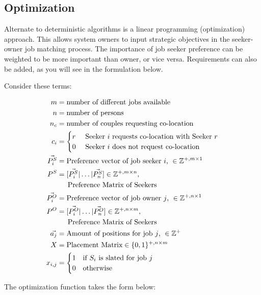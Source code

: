 \subsection{Optimization}

Alternate to deterministic algorithms is a linear programming (optimization) approach. This allows system owners to input strategic objectives in the seeker-owner job matching process. The importance of job seeker preference can be weighted to be more important than owner, or vice versa. Requirements can also be added, as you will see in the formulation below.

Consider these terms:

\begin{align}
m &= \text{number of different jobs available}\\
n &= \text{number of persons}\\
n_c &= \text{number of couples requesting co-location}\\
c_i &= \begin{cases}
r & \text{ Seeker $i$ requests co-location with Seeker $r$} \\
0 & \text{ Seeker $i$ does not request co-location}
\end{cases} \\
\vec{P^S_i} &= \text{Preference vector of job seeker $i$, } \in \mathbb{Z}^{+, m \times 1} \\
P^S &= [\vec{P^S_i} | \dots | \vec{P^S_n}] \in \mathbb{Z}^{+, m \times n}, \\ 
&\text{\indent Preference Matrix of Seekers} \\
\vec{P^O_i} &= \text{Preference vector of job owner $j$, } \in \mathbb{Z}^{+, n \times 1} \\
P^O &= [\vec{P^O_i} | \dots | \vec{P^O_n}] \in \mathbb{Z}^{+, n \times m}, \\ 
&\text{\indent Preference Matrix of Seekers} \\
\vec{a_j} &= \text{Amount of positions for job $j$, } \in \mathbb{Z}^{+} \\
X &= \text{Placement Matrix} \in \{0,1\}^{+, n \times m} \\
x_{i,j} &= \begin{cases}
1 & \text{if $S_i$ is slated for job $j$}\\
0 & \text{otherwise}
\end{cases}
\end{align}

The optimization function takes the form below:

